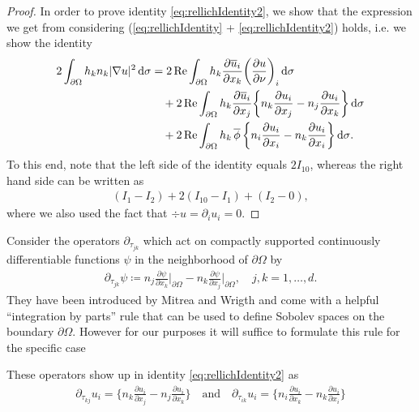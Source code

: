 \begin{proof}
  In order to prove identity \eqref{eq:rellichIdentity2}, we show that the expression we get from considering (\eqref{eq:rellichIdentity} + \eqref{eq:rellichIdentity2}) holds, i.e. we show the identity
  \begin{align*}
    2 \int_{\partial\Omega} h_k n_k |\nabla u|^2 \, {\operatorname{d}\!{\sigma}}
    &= 2 \operatorname{Re} \int_{\partial\Omega} h_k \frac{\partial \overline u_i}{\partial x_k} \bigg( \frac{\partial u}{\partial \nu} \bigg)_i \, {\operatorname{d}\!{\sigma}} \\
    &\quad + 2 \operatorname{Re} \int_{\partial\Omega} h_k \frac{\partial\overline u_i}{\partial x_j} \bigg\{ n_k \frac{\partial u_i}{\partial x_j} - n_j \frac{\partial u_i}{\partial x_k} \bigg\} \, {\operatorname{d}\!{\sigma}} \\
    &\quad+ 2 \operatorname{Re} \int_{\partial\Omega} h_k \, \overline \phi\,  \bigg\{ n_i \frac{\partial u_i}{\partial x_i} - n_k \frac{\partial u_i}{\partial x_i} \bigg\} \, {\operatorname{d}\!{\sigma}}.
  \end{align*}
  To this end, note that the left side of the identity equals $2 I_{10}$, whereas the right hand side can be written as 
  \begin{align*}
    (I_1 - I_2) + 2 (I_{10} - I_1) + (I_2 - 0),
  \end{align*}
  where we also used the fact that $\div u = \partial_i u_i = 0$.
\end{proof}

Consider the operators $\partial_{\tau_{jk}}$ which act on compactly supported continuously differentiable functions $\psi$ in the neighborhood of $\partial\Omega$ by
\begin{align}
  \label{eq:defnTangDerivative}
  \partial_{\tau_{jk}} \psi \coloneqq n_j \frac{\partial \psi}{\partial x_k} \bigg|_{\partial\Omega} - n_k \frac{\partial \psi}{\partial x_j} \bigg|_{\partial\Omega}, \quad j,k = 1,\dots,d.
\end{align}
They have been introduced by Mitrea and Wrigth \cite[p. 16]{mitreaWright} and come with a helpful  ``integration by parts'' rule that can be used to define Sobolev spaces on the boundary $\partial\Omega$. However for our purposes it will suffice to formulate this rule for the specific case

These operators show up in identity \eqref{eq:rellichIdentity2} as
\begin{align*}
  \partial_{\tau_{kj}} u_i = \Big\{ n_k \frac{\partial u_i}{\partial x_j} - n_j \frac{\partial u_i}{\partial x_k} \Big\}
  \quad\text{and}\quad
  \partial_{\tau_{ik}} u_i =  \Big\{ n_i \frac{\partial u_i}{\partial x_k} - n_k \frac{\partial u_i}{\partial x_i} \Big\}
\end{align*}


